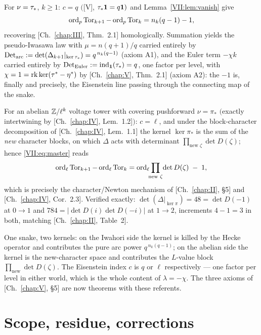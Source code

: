 \begin{corollary}\label{VII:cor:iwahori}
For $\nu=\tau_*$, $k\ge1$: $c=q$ $($[V], $\tau_*\mathbf1=q\mathbf1)$ and
Lemma~\ref{VII:lem:vanish} give
\[
\operatorname{ord}_p\operatorname{Tor}_{k+1}-\operatorname{ord}_p\operatorname{Tor}_k=n_k(q-1)-1 ,
\]
recovering {\rm[Ch.~\ref{chap:III}, Thm.~2.1]} homologically. Summation yields the pseudo-Iwasawa
law with $\mu=n(q+1)/q$ carried entirely by
$\mathrm{Det_{arc}}:=\det(\Delta_{k+1}|_{\ker\tau_*})=q^{\,n_k(q-1)}$ (axiom A1), and
the Euler term $-\chi k$ carried entirely by
$\mathrm{Det_{Euler}}:=\operatorname{ind}_{\mathbf1}(\tau_*)=q$, one factor per level, with
$\chi=1=\operatorname{rk}\ker(\tau^*-\eta^*)$ by {\rm[Ch.~\ref{chap:V}, Thm.~2.1]} (axiom A2): the $-1$ is,
finally and precisely, the Eisenstein line passing through the connecting map of the
snake.
\end{corollary}

\begin{corollary}\label{VII:cor:abelian}
For an abelian $\mathbb{Z}/\ell^{k}$ voltage tower with covering pushforward $\nu=\pi_*$
$($exactly intertwining by {\rm[Ch.~\ref{chap:IV}, Lem.~1.2]}$)$: $c=\ell$, and under the
block-character decomposition of {\rm[Ch.~\ref{chap:IV}, Lem.~1.1]} the kernel $\ker\pi_*$ is the
sum of the \emph{new} character blocks, on which $\Delta$ acts with determinant
$\prod_{\text{new }\zeta}\det D(\zeta)$; hence \eqref{VII:eq:master} reads
\[
\operatorname{ord}_\ell\operatorname{Tor}_{k+1}-\operatorname{ord}_\ell\operatorname{Tor}_k
=\operatorname{ord}_\ell\!\!\prod_{\text{new }\zeta}\!\det D(\zeta)\;-\;1 ,
\]
which is precisely the character/Newton mechanism of {\rm[Ch.~\ref{chap:II}, \S5]} and
{\rm[Ch.~\ref{chap:IV}, Cor.~2.3]}. Verified exactly: $\det(\Delta|_{\ker\pi})=48=\det D(-1)$ at
$0\to1$ and $784=|\det D(i)\det D(-i)|$ at $1\to2$, increments $4-1=3$ in both,
matching {\rm[Ch.~\ref{chap:II}, Table~2]}.
\end{corollary}

One snake, two kernels: on the Iwahori side the kernel is killed by the Hecke
operator and contributes the pure arc power $q^{\,n_k(q-1)}$; on the abelian side
the kernel is the new-character space and contributes the $L$-value block
$\prod_{\text{new}}\det D(\zeta)$. The Eisenstein index $c$ is $q$ or $\ell$
respectively --- one factor per level in either world, which is the whole content of
$\lambda=-\chi$. The three axioms of [Ch.~\ref{chap:V}, \S5] are now theorems with these referents.

\section{Scope, residue, corrections}\label{VII:sec:scope}

